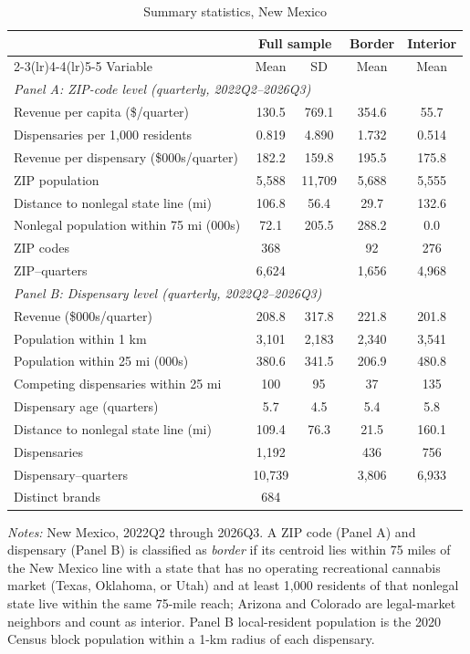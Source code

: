 \begin{table}[htbp]
\centering
\caption{Summary statistics, New Mexico}
\label{tab:sumstats_nm}
\footnotesize
\begin{tabular}{lcccc}
\toprule
 & \multicolumn{2}{c}{Full sample} & Border & Interior \\
\cmidrule(lr){2-3}\cmidrule(lr){4-4}\cmidrule(lr){5-5}
Variable & Mean & SD & Mean & Mean \\
\midrule
\multicolumn{5}{l}{\textit{Panel A: ZIP-code level (quarterly, 2022Q2--2026Q3)}} \\
Revenue per capita (\$/quarter) & 130.5 & 769.1 & 354.6 & 55.7 \\
Dispensaries per 1,000 residents & 0.819 & 4.890 & 1.732 & 0.514 \\
Revenue per dispensary (\$000s/quarter) & 182.2 & 159.8 & 195.5 & 175.8 \\
ZIP population & 5,588 & 11,709 & 5,688 & 5,555 \\
Distance to nonlegal state line (mi) & 106.8 & 56.4 & 29.7 & 132.6 \\
Nonlegal population within 75 mi (000s) & 72.1 & 205.5 & 288.2 & 0.0 \\
\addlinespace
ZIP codes & 368 & & 92 & 276 \\
ZIP--quarters & 6,624 & & 1,656 & 4,968 \\
\midrule
\multicolumn{5}{l}{\textit{Panel B: Dispensary level (quarterly, 2022Q2--2026Q3)}} \\
Revenue (\$000s/quarter) & 208.8 & 317.8 & 221.8 & 201.8 \\
Population within 1 km & 3,101 & 2,183 & 2,340 & 3,541 \\
Population within 25 mi (000s) & 380.6 & 341.5 & 206.9 & 480.8 \\
Competing dispensaries within 25 mi & 100 & 95 & 37 & 135 \\
Dispensary age (quarters) & 5.7 & 4.5 & 5.4 & 5.8 \\
Distance to nonlegal state line (mi) & 109.4 & 76.3 & 21.5 & 160.1 \\
\addlinespace
Dispensaries & 1,192 & & 436 & 756 \\
Dispensary--quarters & 10,739 & & 3,806 & 6,933 \\
Distinct brands & 684 & & & \\
\bottomrule
\end{tabular}
\begin{minipage}{0.92\textwidth}
\vspace{0.4em}\footnotesize
\textit{Notes:} New Mexico, 2022Q2 through 2026Q3. A ZIP code (Panel A) and dispensary (Panel B) is classified as \emph{border} if its centroid lies within 75 miles of the New Mexico line with a state that has no operating recreational cannabis market (Texas, Oklahoma, or Utah) and at least 1{,}000 residents of that nonlegal state live within the same 75-mile reach; Arizona and Colorado are legal-market neighbors and count as interior. Panel B local-resident population is the 2020 Census block population within a 1-km radius of each dispensary.
\end{minipage}
\end{table}
